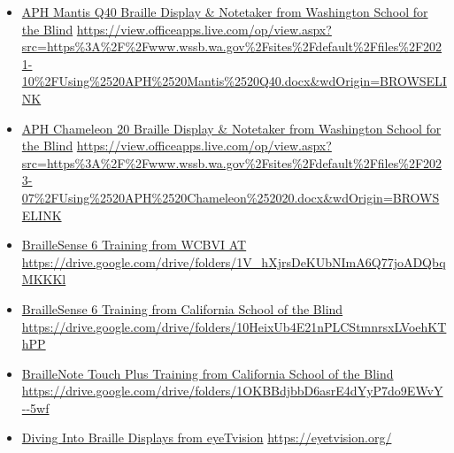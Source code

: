 \begin{itemize}[leftmargin=*]
\item \href{https://view.officeapps.live.com/op/view.aspx?src=https%3A%2F%2Fwww.wssb.wa.gov%2Fsites%2Fdefault%2Ffiles%2F2021-10%2FUsing%2520APH%2520Mantis%2520Q40.docx&wdOrigin=BROWSELINK}{APH Mantis Q40 Braille Display \& Notetaker from Washington School for the Blind} \break\url{https://view.officeapps.live.com/op/view.aspx?src=https%3A%2F%2Fwww.wssb.wa.gov%2Fsites%2Fdefault%2Ffiles%2F2021-10%2FUsing%2520APH%2520Mantis%2520Q40.docx&wdOrigin=BROWSELINK}
\item \href{https://view.officeapps.live.com/op/view.aspx?src=https%3A%2F%2Fwww.wssb.wa.gov%2Fsites%2Fdefault%2Ffiles%2F2023-07%2FUsing%2520APH%2520Chameleon%252020.docx&wdOrigin=BROWSELINK}{APH Chameleon 20 Braille Display \& Notetaker from Washington School for the Blind} \break\url{https://view.officeapps.live.com/op/view.aspx?src=https%3A%2F%2Fwww.wssb.wa.gov%2Fsites%2Fdefault%2Ffiles%2F2023-07%2FUsing%2520APH%2520Chameleon%252020.docx&wdOrigin=BROWSELINK}
\item \href{https://drive.google.com/drive/folders/1V_hXjrsDeKUbNImA6Q77joADQbqMKKKl}{BrailleSense 6 Training from WCBVI AT} \break\url{https://drive.google.com/drive/folders/1V_hXjrsDeKUbNImA6Q77joADQbqMKKKl}
\item \href{https://drive.google.com/drive/folders/10HeixUb4E21nPLCStmnrsxLVoehKThPP}{BrailleSense 6 Training from California School of the Blind} \break\url{https://drive.google.com/drive/folders/10HeixUb4E21nPLCStmnrsxLVoehKThPP}
\item \href{https://drive.google.com/drive/folders/1OKBBdjbbD6asrE4dYyP7do9EWvY--5wf}{BrailleNote Touch Plus Training from California School of the Blind} \break\url{https://drive.google.com/drive/folders/1OKBBdjbbD6asrE4dYyP7do9EWvY--5wf}
\item \href{https://eyetvision.org/}{Diving Into Braille Displays from eyeTvision} \break\url{https://eyetvision.org/}
\end{itemize}

